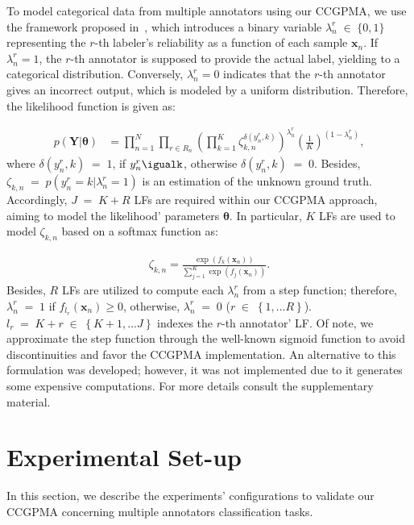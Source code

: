 \documentclass[journal]{IEEEtran}
\providecommand{\ve}[1]{{\bm{#1}}}%
\providecommand{\mat}[1]{{\bm{#1}}} %
\DeclareMathOperator{\en}{\!\,\in\!\,}
\DeclareMathOperator{\igual}{\!\,=\!\,}
\providecommand{\ve}[1]{{\mathbf{#1}}}
\providecommand{\mat}[1]{{\mathbf{#1}}}
\begin{document}
To model categorical data from multiple annotators using our CCGPMA, we use the framework proposed in~\cite{rodrigues2013learning}, which introduces a binary variable $\lambda_n^r\en \{0,1\}$ representing the $r$-th labeler's reliability as a function of each sample $\ve{x}_n$. If $\lambda_n^r=1$, the $r$-th annotator is supposed to provide the actual label, yielding to a categorical distribution. Conversely, $\lambda_n^r=0$ indicates that the $r$-th annotator gives an incorrect output, which is modeled by a uniform distribution. Therefore, the likelihood function is given as:

\begin{align}
\label{eq:ClasLik}
 p(\mat{Y}|\bm{\theta}) &= \prod^N_{n=1}\prod_{r\in R_n}\left(\prod_{k=1}^{K}\zeta_{k,n}^{\delta(y_n^r,k)}\right)^{{\lambda}_n^r}\left(\frac{1}{K}\right)^{(1-{\lambda}_n^r)},
\end{align}
where $\delta(y_n^r,k)\igual1$, if $y_n^r\igualk$, otherwise $\delta(y_n^r,k)\igual0$. Besides, $\zeta_{k,n}\igual p(y_n^r=k|\lambda_n^r=1)$ is an estimation of the unknown ground truth. Accordingly, $J\igual K+R$ LFs are required within our CCGPMA approach, aiming to model the likelihood' parameters $\bm{\theta}$. In particular, $K$ LFs are used to model $\zeta_{k,n}$ based on a softmax function as:

\begin{align}
\zeta_{k,n} = \frac{\exp(f_k(\ve{x}_n))}{\sum_{j=1}^{K}\exp(f_j(\ve{x}_n))}.
\end{align}
Besides, $R$ LFs are utilized to compute each ${\lambda}_n^r$ from a step function; therefore, ${\lambda}_n^r\igual 1$ if $f_{l_r}(\ve{x}_n)\geq 0$, otherwise, ${\lambda}_n^r\igual 0$  ($r\en \left\{1, \dots R\right\}$). $l_r \igual K+r \en \left\{K+1, \dots J\right\}$ indexes the $r$-th annotator' LF. Of note, we approximate the step function through the well-known sigmoid function to avoid discontinuities and favor the CCGPMA implementation. An alternative to this formulation was developed; however, it was not implemented due to it generates some expensive computations. For more details consult the supplementary material.

\section{Experimental Set-up}\label{sec:expsetup}
In this section, we describe the experiments' configurations
to validate our CCGPMA concerning multiple annotators classification tasks.
\end{document}
